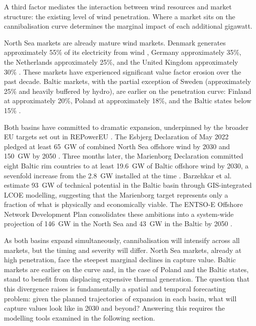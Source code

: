 A third factor mediates the interaction between wind resources and market structure: the existing level of wind penetration. Where a market sits on the cannibalisation curve determines the marginal impact of each additional gigawatt.

\vspace{4pt}

North Sea markets are already mature wind markets. Denmark generates approximately 55\% of its electricity from wind \cite{DanishEnergyAgency2024}, Germany approximately 35\%, the Netherlands approximately 25\%, and the United Kingdom approximately 30\% \cite{Ember2025, WindEurope2024Stats}. These markets have experienced significant value factor erosion over the past decade. Baltic markets, with the partial exception of Sweden (approximately 25\% and heavily buffered by hydro), are earlier on the penetration curve: Finland at approximately 20\%, Poland at approximately 18\%, and the Baltic states below 15\% \cite{Ember2025, EmberGlobal2024}.

\vspace{4pt}

Both basins have committed to dramatic expansion, underpinned by the broader EU targets set out in REPowerEU \cite{REPowerEU2022}. The Esbjerg Declaration of May 2022 pledged at least 65~GW of combined North Sea offshore wind by 2030 and 150~GW by 2050 \cite{Esbjerg2022}. Three months later, the Marienborg Declaration committed eight Baltic rim countries to at least 19.6~GW of Baltic offshore wind by 2030, a sevenfold increase from the 2.8~GW installed at the time \cite{Marienborg2022}. Barzehkar et al. \cite{Barzehkar2024} estimate 93~GW of technical potential in the Baltic basin through GIS-integrated LCOE modelling, suggesting that the Marienborg target represents only a fraction of what is physically and economically viable. The ENTSO-E Offshore Network Development Plan consolidates these ambitions into a system-wide projection of 146~GW in the North Sea and 43~GW in the Baltic by 2050 \cite{ONDP2024}.

\vspace{4pt}

As both basins expand simultaneously, cannibalisation will intensify across all markets, but the timing and severity will differ. North Sea markets, already at high penetration, face the steepest marginal declines in capture value. Baltic markets are earlier on the curve and, in the case of Poland and the Baltic states, stand to benefit from displacing expensive thermal generation. The question that this divergence raises is fundamentally a spatial and temporal forecasting problem: given the planned trajectories of expansion in each basin, what will capture values look like in 2030 and beyond? Answering this requires the modelling tools examined in the following section.


